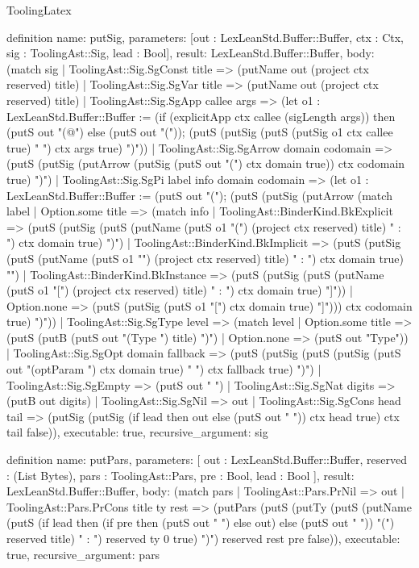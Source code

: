 \begin{lexlean}{ToolingLatex}
\begin{semanticmodule}
definition{
  name: putSig,
  parameters: [out : LexLeanStd.Buffer::Buffer, ctx : Ctx, sig : ToolingAst::Sig, lead : Bool],
  result: LexLeanStd.Buffer::Buffer,
  body: (match sig
    | ToolingAst::Sig.SgConst title => (putName out (project ctx reserved) title)
    | ToolingAst::Sig.SgVar title => (putName out (project ctx reserved) title)
    | ToolingAst::Sig.SgApp callee args => (let o1 : LexLeanStd.Buffer::Buffer := (if (explicitApp ctx callee (sigLength args)) then (putS out "(@") else (putS out "(")); (putS (putSig (putS (putSig o1 ctx callee true) " ") ctx args true) ")"))
    | ToolingAst::Sig.SgArrow domain codomain => (putS (putSig (putArrow (putSig (putS out "(") ctx domain true)) ctx codomain true) ")")
    | ToolingAst::Sig.SgPi label info domain codomain => (let o1 : LexLeanStd.Buffer::Buffer := (putS out "("); (putS (putSig (putArrow (match label
      | Option.some title => (match info
        | ToolingAst::BinderKind.BkExplicit => (putS (putSig (putS (putName (putS o1 "(") (project ctx reserved) title) " : ") ctx domain true) ")")
        | ToolingAst::BinderKind.BkImplicit => (putS (putSig (putS (putName (putS o1 "{") (project ctx reserved) title) " : ") ctx domain true) "}")
        | ToolingAst::BinderKind.BkInstance => (putS (putSig (putS (putName (putS o1 "[") (project ctx reserved) title) " : ") ctx domain true) "]"))
      | Option.none => (putS (putSig (putS o1 "[") ctx domain true) "]"))) ctx codomain true) ")"))
    | ToolingAst::Sig.SgType level => (match level
      | Option.some title => (putS (putB (putS out "(Type ") title) ")")
      | Option.none => (putS out "Type"))
    | ToolingAst::Sig.SgOpt domain fallback => (putS (putSig (putS (putSig (putS out "(optParam ") ctx domain true) " ") ctx fallback true) ")")
    | ToolingAst::Sig.SgEmpty => (putS out "{ }")
    | ToolingAst::Sig.SgNat digits => (putB out digits)
    | ToolingAst::Sig.SgNil => out
    | ToolingAst::Sig.SgCons head tail => (putSig (putSig (if lead then out else (putS out " ")) ctx head true) ctx tail false)),
  executable: true,
  recursive_argument: sig
}

definition{
  name: putPars,
  parameters: [
    out : LexLeanStd.Buffer::Buffer,
    reserved : (List Bytes),
    pars : ToolingAst::Pars,
    pre : Bool,
    lead : Bool
  ],
  result: LexLeanStd.Buffer::Buffer,
  body: (match pars
    | ToolingAst::Pars.PrNil => out
    | ToolingAst::Pars.PrCons title ty rest => (putPars (putS (putTy (putS (putName (putS (if lead then (if pre then (putS out " ") else out) else (putS out " ")) "(") reserved title) " : ") reserved ty 0 true) ")") reserved rest pre false)),
  executable: true,
  recursive_argument: pars
}


\end{semanticmodule}
\end{lexlean}
